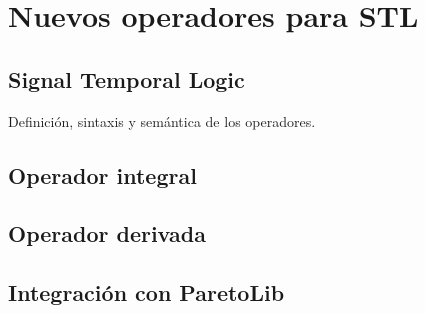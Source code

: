 \chapter{Nuevos operadores para STL}
\label{cha:stl}

\section{Signal Temporal Logic}
Definición, sintaxis y semántica de los operadores.

\section{Operador integral}


\section{Operador derivada}

\section{Integración con ParetoLib}
